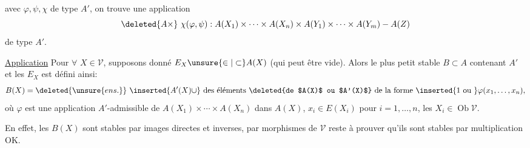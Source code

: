 avec $\varphi,\psi,\chi$ de type $A'$, on trouve une application
\[
\deleted{A\times}\ \chi(\varphi,\psi):A(X_1)\times\cdots\times A(X_n)\times A(Y_1)\times\cdots\times A(Y_m)-A(Z)
\]
de type $A'$.

\uline{Application}  Pour $\forall$ $X\in\mathcal V$, supposons donné $E_X\unsure{\in|\subset} A(X)$ (qui peut être vide).
Alors le plus petit  stable $B\subset A$ contenant $A'$ et les $E_X$ est défini ainsi:
\[
B(X)=\deleted{\unsure{ens.}}\ \inserted{A'(X)\cup}\ \text{des éléments \deleted{de $A(X)$ ou $A'(X)$} de la forme }\inserted{1\text{ ou }}\varphi(x_1,\ldots,x_n),
\]
où $\varphi$ est une application $A'$-admissible de $A(X_1)\times\cdots\times A(X_n)$ dans $A(X)$, $x_i\in E(X_i)$ pour $i=1,\ldots,n$, les $X_i\in\operatorname{Ob}\mathcal V$.

En effet, les $B(X)$  sont stables par images directes et inverses,  par morphismes de $\mathcal V$  reste à prouver qu'ils sont stables par multiplication OK.
